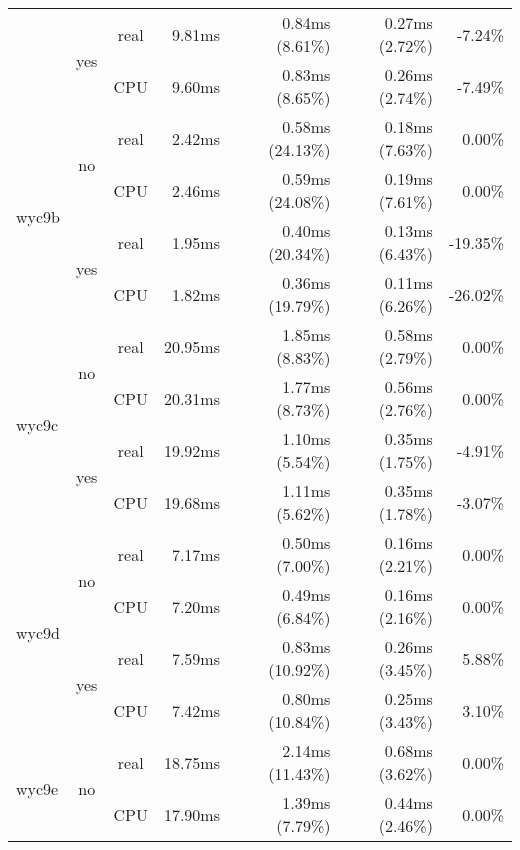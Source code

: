 \documentclass[en]{pracamgr}
\begin{document}
\begin{small}
\begin{longtable}{|l|c|c|r|r|r|r|}
                          \cline{2-7}
                          & \multirow{2}{*}{yes} & real & 9.81ms & 0.84ms (8.61\%) & 0.27ms (2.72\%) & -7.24\% \\*
                          &                      & CPU  & 9.60ms & 0.83ms (8.65\%) & 0.26ms (2.74\%) & -7.49\% \\
\hline
\multirow{4}{*}{wyc9b}    & \multirow{2}{*}{no}  & real & 2.42ms & 0.58ms (24.13\%) & 0.18ms (7.63\%) & 0.00\% \\*
                          &                      & CPU  & 2.46ms & 0.59ms (24.08\%) & 0.19ms (7.61\%) & 0.00\% \\*
                          \cline{2-7}
                          & \multirow{2}{*}{yes} & real & 1.95ms & 0.40ms (20.34\%) & 0.13ms (6.43\%) & -19.35\% \\*
                          &                      & CPU  & 1.82ms & 0.36ms (19.79\%) & 0.11ms (6.26\%) & -26.02\% \\
\hline
\multirow{4}{*}{wyc9c}    & \multirow{2}{*}{no}  & real & 20.95ms & 1.85ms (8.83\%) & 0.58ms (2.79\%) & 0.00\% \\*
                          &                      & CPU  & 20.31ms & 1.77ms (8.73\%) & 0.56ms (2.76\%) & 0.00\% \\*
                          \cline{2-7}
                          & \multirow{2}{*}{yes} & real & 19.92ms & 1.10ms (5.54\%) & 0.35ms (1.75\%) & -4.91\% \\*
                          &                      & CPU  & 19.68ms & 1.11ms (5.62\%) & 0.35ms (1.78\%) & -3.07\% \\
\hline
\multirow{4}{*}{wyc9d}    & \multirow{2}{*}{no}  & real & 7.17ms & 0.50ms (7.00\%) & 0.16ms (2.21\%) & 0.00\% \\*
                          &                      & CPU  & 7.20ms & 0.49ms (6.84\%) & 0.16ms (2.16\%) & 0.00\% \\*
                          \cline{2-7}
                          & \multirow{2}{*}{yes} & real & 7.59ms & 0.83ms (10.92\%) & 0.26ms (3.45\%) & 5.88\% \\*
                          &                      & CPU  & 7.42ms & 0.80ms (10.84\%) & 0.25ms (3.43\%) & 3.10\% \\
\hline
\multirow{4}{*}{wyc9e}    & \multirow{2}{*}{no}  & real & 18.75ms & 2.14ms (11.43\%) & 0.68ms (3.62\%) & 0.00\% \\*
                          &                      & CPU  & 17.90ms & 1.39ms (7.79\%) & 0.44ms (2.46\%) & 0.00\% \\*

\end{longtable}
\end{small}
\end{document}
